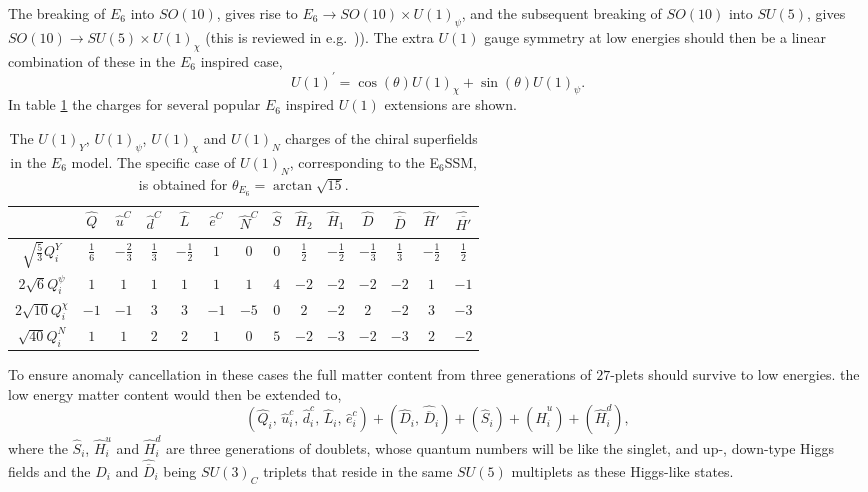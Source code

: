 \documentclass[preprint,amsmath,amssymb,aps,superscriptaddress,prd,showpacs,floatfix]{revtex4-1}
\newcommand{\be}{\begin{equation}}
\newcommand{\ee}{\end{equation}}
\begin{document}
The breaking of $E_6$ into $SO(10)$, gives rise to $E_6\to
SO(10)\times U(1)_{\psi}$, and the subsequent breaking of $SO(10)$
into $SU(5)$, gives $SO(10)\to SU(5)\times U(1)_{\chi}$ (this is
reviewed in e.g.~\cite{Langacker:2008yv})). The extra $U(1)$ gauge symmetry at low energies should then be a linear combination of these in the $E_6$ inspired case,
\be
U(1)^\prime = \cos(\theta) U(1)_{\chi} + \sin(\theta) U(1)_{\psi}.
\ee In table \ref{tab:E6charges} the charges for several popular $E_6$ inspired $U(1)$ extensions are shown.
\begin{table}[h]
\centering
\begin{ruledtabular}
\begin{tabular}{cccccccccccccc}
 & $\hat{Q}$ & $\hat{u}^C$ & $\hat{d}^C$ & $\hat{L}$ & $\hat{e}^C$ & $\hat{N}^C$ & $\hat{S}$ & $\hat{H}_2$ & $\hat{H}_1$ & $\hat{D}$ & $\hat{\overline{D}}$ & $\hat{H}'$ & $\hat{\overline{H'}}$ \\[1mm]
\hline
$\sqrt{\frac{5}{3}}Q_i^Y$ & $\frac{1}{6}$ & $-\frac{2}{3}$ & $\frac{1}{3}$ & $-\frac{1}{2}$ & $1$ & $0$ & $0$ & $\frac{1}{2}$ & $-\frac{1}{2}$ & $-\frac{1}{3}$ & $\frac{1}{3}$ & $-\frac{1}{2}$ & $\frac{1}{2}$ \\[1mm]
$2\sqrt{6}Q_i^\psi$ & $1$ & $1$ & $1$ & $1$ & $1$ & $1$ & $4$ & $-2$ & $-2$ & $-2$ & $-2$ & $1$ & $-1$\\[1mm]
$2\sqrt{10}Q_i^\chi$ & $-1$ & $-1$ & $3$ & $3$ & $-1$ & $-5$ & $0$ & $2$ & $-2$ & $2$ & $-2$ & $3$ & $-3$\\[1mm]
$\sqrt{40}Q_i^N$ & $1$ & $1$ & $2$ & $2$ & $1$ & $0$ & $5$ & $-2$ & $-3$ & $-2$ & $-3$ & $2$ & $-2$ \\[1mm]
\end{tabular}
\end{ruledtabular}
\caption{The $U(1)_Y$, $U(1)_\psi$, $U(1)_\chi$ and $U(1)_N$ charges of the chiral superfields in the $E_6$ model. The specific case of $U(1)_N$, corresponding to the E$_6$SSM, is obtained for $\theta_{E_6}=\arctan\sqrt{15}$.}
\label{tab:E6charges}
\end{table}

To ensure anomaly cancellation in these cases the full matter content
from three generations of $27$-plets should survive to low energies.
the low energy matter content would then be extended to, \be
(\hat{Q}_i,\,\hat{u}^c_i,\,\hat{d}^c_i,\,\hat{L}_i,\,\hat{e}^c_i)
+(\hat{D}_i,\,\hat{\overline{D}}_i)+(\hat{S}_{i})+(\hat{H}^u_i)+(\hat{H}^d_i),\ee
where the $\hat{S}_{i}$, $\hat{H}^u_i$ and $\hat{H}^d_i$ are three
generations of doublets, whose quantum numbers will be like the
singlet, and up-, down-type Higgs fields and the $\hat{D}_i$ and
$\hat{\overline{D}}_i$ being $SU(3)_C$ triplets that reside in the same $SU(5)$
multiplets as these Higgs-like states.
\end{document}
